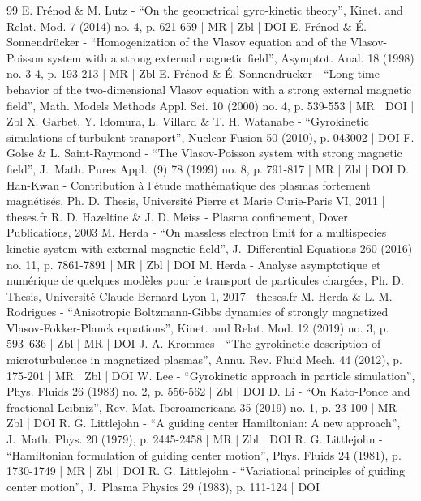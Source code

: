 \begin{thebibliography}{99}
E. Frénod \& M. Lutz - “On the geometrical gyro-kinetic theory”, Kinet. and Relat. Mod. 7 (2014) no. 4, p. 621-659 | MR | Zbl | DOI
E. Frénod \& É. Sonnendrücker - “Homogenization of the Vlasov equation and of the Vlasov-Poisson system with a strong external magnetic field”, Asymptot. Anal. 18 (1998) no. 3-4, p. 193-213 | MR | Zbl
E. Frénod \& É. Sonnendrücker - “Long time behavior of the two-dimensional Vlasov equation with a strong external magnetic field”, Math. Models Methods Appl. Sci. 10 (2000) no. 4, p. 539-553 | MR | DOI | Zbl
X. Garbet, Y. Idomura, L. Villard \& T. H. Watanabe - “Gyrokinetic simulations of turbulent transport”, Nuclear Fusion 50 (2010), p. 043002 | DOI
F. Golse \& L. Saint-Raymond - “The Vlasov-Poisson system with strong magnetic field”, J. Math. Pures Appl. (9) 78 (1999) no. 8, p. 791-817 | MR | Zbl | DOI
D. Han-Kwan - Contribution à l’étude mathématique des plasmas fortement magnétisés, Ph. D. Thesis, Université Pierre et Marie Curie-Paris VI, 2011 | theses.fr
R. D. Hazeltine \& J. D. Meiss - Plasma confinement, Dover Publications, 2003
M. Herda - “On massless electron limit for a multispecies kinetic system with external magnetic field”, J. Differential Equations 260 (2016) no. 11, p. 7861-7891 | MR | Zbl | DOI
M. Herda - Analyse asymptotique et numérique de quelques modèles pour le transport de particules chargées, Ph. D. Thesis, Université Claude Bernard Lyon 1, 2017 | theses.fr
M. Herda \& L. M. Rodrigues - “Anisotropic Boltzmann-Gibbs dynamics of strongly magnetized Vlasov-Fokker-Planck equations”, Kinet. and Relat. Mod. 12 (2019) no. 3, p. 593–636 | Zbl | MR | DOI
J. A. Krommes - “The gyrokinetic description of microturbulence in magnetized plasmas”, Annu. Rev. Fluid Mech. 44 (2012), p. 175-201 | MR | Zbl | DOI
W. Lee - “Gyrokinetic approach in particle simulation”, Phys. Fluids 26 (1983) no. 2, p. 556-562 | Zbl | DOI
D. Li - “On Kato-Ponce and fractional Leibniz”, Rev. Mat. Iberoamericana 35 (2019) no. 1, p. 23-100 | MR | Zbl | DOI
R. G. Littlejohn - “A guiding center Hamiltonian: A new approach”, J. Math. Phys. 20 (1979), p. 2445-2458 | MR | Zbl | DOI
R. G. Littlejohn - “Hamiltonian formulation of guiding center motion”, Phys. Fluids 24 (1981), p. 1730-1749 | MR | Zbl | DOI
R. G. Littlejohn - “Variational principles of guiding center motion”, J. Plasma Physics 29 (1983), p. 111-124 | DOI

\end{thebibliography}
